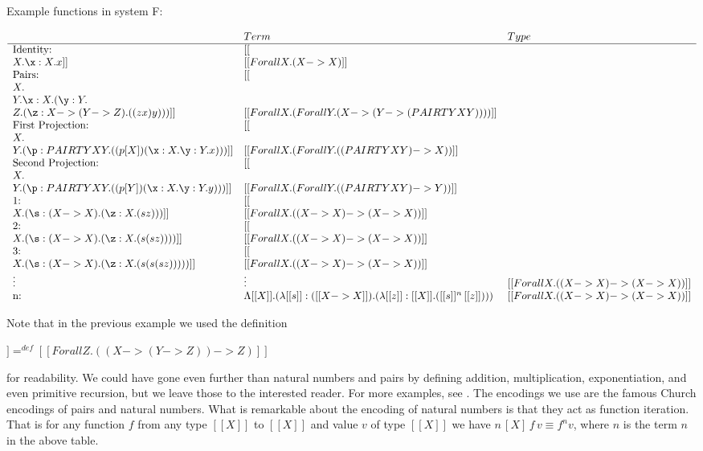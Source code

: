 \begin{example}
  \label{ex:F_terms}
  Example functions in system F:
  \begin{center}
    \footnotesize
    \begin{math}
      \begin{array}{lll}
                         & Term           & Type\\
        \hline
\text{Identity:} & [[\\X.\x:X.x]] & [[Forall X.(X -> X)]]\\
\text{Pairs:}    & [[\\X.\\Y.\x:X.(\y:Y.\\Z.(\z:X->(Y->Z).((z x) y)))]] & 
     [[Forall X.(Forall Y.(X -> (Y -> (PAIRTY X Y))))]]\\
\text{First Projection:} & [[\\X.\\Y.(\p:PAIRTY X Y.((p [X]) (\x:X.\y:Y.x)))]] & [[Forall X.(Forall Y.((PAIRTY X Y) -> X))]]\\
\text{Second Projection:} & [[\\X.\\Y.(\p:PAIRTY X Y.((p [Y]) (\x:X.\y:Y.y)))]] & [[Forall X.(Forall Y.((PAIRTY X Y) -> Y))]]\\
\text{1:} & [[\\X.(\s:(X->X).(\z:X.(s z)))]] & [[Forall X.((X->X)->(X->X))]]\\
\text{2:} & [[\\X.(\s:(X->X).(\z:X.(s (s z))))]] & [[Forall X.((X->X)->(X->X))]]\\
\text{3:} & [[\\X.(\s:(X->X).(\z:X.(s (s (s z)))))]] & [[Forall X.((X->X)->(X->X))]]\\
\vdots    & \vdots                                   & [[Forall X.((X->X)->(X->X))]]\\
\text{n:} & \Lambda [[X]].(\lambda [[s]]:([[X->X]]).(\lambda[[z]]:[[X]].([[s]]^n\,[[z]]))) & [[Forall X.((X->X)->(X->X))]]\\
      \end{array}
    \end{math}
  \end{center}
\end{example}
Note that in the previous example we used the definition 
\begin{center}
  \begin{math}
    [[PAIRTY X Y]] =^{def} [[Forall Z.((X -> (Y -> Z)) -> Z)]]
  \end{math}
\end{center}
for readability. We could have gone even further than natural numbers
and pairs by defining
addition, multiplication, exponentiation, and even primitive
recursion, but we leave those to the interested reader.  For more
examples, see \cite{Girard:1989}.  The encodings we use are the famous
Church encodings of pairs and natural numbers.  What is remarkable
about the encoding of natural numbers is that they act as function
iteration.  That is for any function $f$ from any type $[[X]]$ to
$[[X]]$ and value $v$ of type $[[X]]$ we have $n\,[X]\,f\,v \equiv f^n
v$, where $n$ is the term $n$ in the above table.

